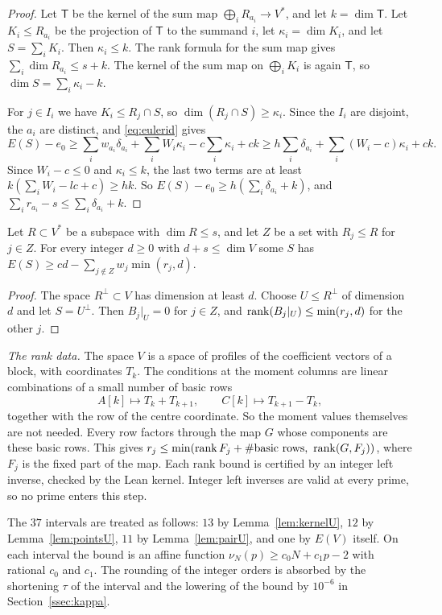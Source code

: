 \begin{proof}
Let $\mathsf T$ be the kernel of the sum map $\bigoplus_iR_{a_i}\to V^*$, and let $k=\dim\mathsf T$. Let $K_i\le R_{a_i}$ be the projection of $\mathsf T$ to the summand $i$, let $\kappa_i=\dim K_i$, and let
$S=\sum_iK_i$. Then $\kappa_i\le k$. The rank formula for the sum map gives $\sum_i\dim R_{a_i}\le s+k$. The kernel of the sum map on $\bigoplus_iK_i$ is again $\mathsf T$, so
$\dim S=\sum_i\kappa_i-k$.

For $j\in I_i$ we have $K_i\le R_j\cap S$, so $\dim(R_j\cap S)\ge\kappa_i$. Since the $I_i$ are disjoint, the $a_i$ are distinct, and \eqref{eq:eulerid} gives
\[
 E(S)-e_0\ge\sum_iw_{a_i}\delta_{a_i}+\sum_iW_i\kappa_i-c\sum_i\kappa_i+ck\ge h\sum_i\delta_{a_i}+\sum_i(W_i-c)\kappa_i+ck.
\]
Since $W_i-c\le0$ and $\kappa_i\le k$, the last two terms are at least $k(\sum_iW_i-lc+c)\ge hk$. So $E(S)-e_0\ge h(\sum_i\delta_{a_i}+k)$, and
$\sum_ir_{a_i}-s\le\sum_i\delta_{a_i}+k$.
\end{proof}

\begin{lemma}[kernel]\label{lem:kernelU}
Let $R\subset V^*$ be a subspace with $\dim R\le s$, and let $Z$ be a set with $R_j\le R$ for $j\in Z$. For every integer $d\ge0$
with $d+s\le\dim V$ some $S$ has
$E(S)\ge cd-\sum_{j\notin Z}w_j\min(r_j,d)$.
\end{lemma}

\begin{proof}
The space $R^\perp\subset V$ has dimension at least $d$. Choose $U\le R^\perp$ of dimension $d$ and let $S=U^\perp$. Then $B_j|_U=0$ for $j\in Z$, and $\operatorname{rank}(B_j|_U)\le\min(r_j,d)$ for
the other $j$.
\end{proof}

\emph{The rank data.} The space $V$ is a space of profiles of the coefficient vectors of a block, with coordinates
$T_k$. The conditions at the moment columns are linear combinations of a small number of basic rows
\[
 A[k]\mapsto T_k+T_{k+1},\qquad C[k]\mapsto T_{k+1}-T_k,
\]
together with the row of the centre coordinate. So the moment values themselves are not needed. Every row factors
through the map $G$ whose components are these basic rows. This gives $r_j\le\min(\rank F_j+\#\text{basic rows},\ \rank(G,F_j))$, where $F_j$ is the fixed part
of the map. Each rank bound is certified by an integer left inverse, checked by the Lean kernel. Integer left
inverses are valid at every prime, so no prime enters this step.

The $37$ intervals are treated as follows: $13$ by Lemma~\ref{lem:kernelU}, $12$ by Lemma~\ref{lem:pointsU}, $11$ by
Lemma~\ref{lem:pairU}, and one by $E(V)$ itself. On each interval the bound is an affine function
$\nu_N(p)\ge c_0N+c_1p-2$ with rational $c_0$ and $c_1$. The rounding of the integer orders is absorbed by
the shortening $\tau$ of the interval and the lowering of the bound by $10^{-6}$ in Section~\ref{ssec:kappa}.

